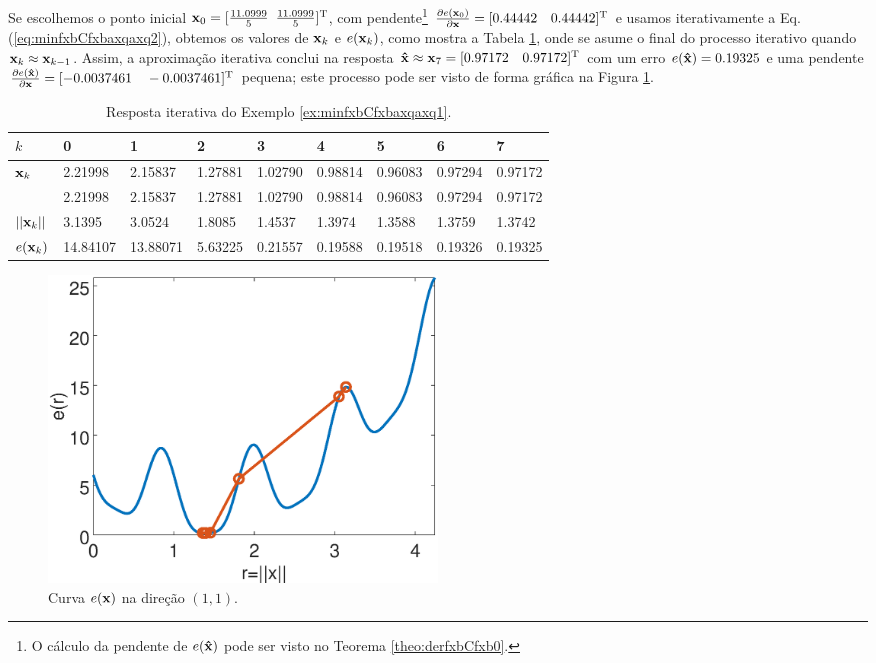 \begin{SolutionT}
\label{ex:minfxbCfxbaxqaxq3:sol2}
Se escolhemos o ponto inicial $\VECTOR{x}_0=[\frac{11.0999}{5}$ $\frac{11.0999}{5}]^{\mathrm{T}}$,
com pendente\footnote{O cálculo da
pendente de $e(\VECTOR{\hat{x}})$ pode ser visto no Teorema \ref{theo:derfxbCfxb0}.} 
$\frac{\partial e(\VECTOR{x}_0)}{\partial \VECTOR{x} }=[0.44442\quad 0.44442]^{\transpose}$ e 
usamos iterativamente a Eq. (\ref{eq:minfxbCfxbaxqaxq2}), obtemos os valores 
de $\VECTOR{x}_k$ e $e(\VECTOR{x}_k)$, como mostra a Tabela \ref{table:ex:minfxbCfxbaxqaxq4},
onde se asume o final do processo iterativo quando $\VECTOR{x}_k \approx \VECTOR{x}_{k-1}$.
Assim, a aproximação iterativa conclui na resposta 
$\VECTOR{\hat{x}}\approx \VECTOR{x}_{7} =[0.97172\quad 0.97172]^{\transpose}$
com um erro $e(\VECTOR{\hat{x}})=0.19325$ e uma pendente
$\frac{\partial e(\VECTOR{\hat{x}})}{\partial \VECTOR{x} }=[-0.0037461\quad -0.0037461]^{\transpose}$
pequena;
este processo pode ser visto de forma gráfica na Figura \ref{fig:ex:minfxbCfxbaxqaxq4:b}.
\end{SolutionT}


\begin{table}[h!]
\centering
\begin{tabular}{|l|l|l|l|l|l|l|l|l|}
\hline
$k$ & 0 & 1 & 2 & 3 & 4 & 5 & 6 & 7\\ \hline
$\VECTOR{x}_k$ & 2.21998 & 2.15837 & 1.27881 & 1.02790 & 0.98814 & 0.96083 & 0.97294 & 0.97172 \\ 
~              & 2.21998 & 2.15837 & 1.27881 & 1.02790 & 0.98814 & 0.96083 & 0.97294 & 0.97172 \\ \hline
$||\VECTOR{x}_k||$ & 3.1395 & 3.0524 & 1.8085 & 1.4537 & 1.3974 & 1.3588 & 1.3759 & 1.3742 \\ \hline
$e(\VECTOR{x}_k)$ & 14.84107 & 13.88071 & 5.63225 & 0.21557 & 0.19588 & 0.19518 & 0.19326 & 0.19325 \\ \hline
\end{tabular}
\caption{Resposta iterativa do Exemplo \ref{ex:minfxbCfxbaxqaxq1}.}
\label{table:ex:minfxbCfxbaxqaxq4}
\end{table}

     \begin{figure}[!h]
         \centering
         \includegraphics[width=0.5\textwidth]{chapters/minimization-fx/mfiles/fxxq3/plotfx4.eps}
         \caption{Curva $e(\VECTOR{x})$ na direção $(1,1)$.}
         \label{fig:ex:minfxbCfxbaxqaxq4:b}
     \end{figure}


